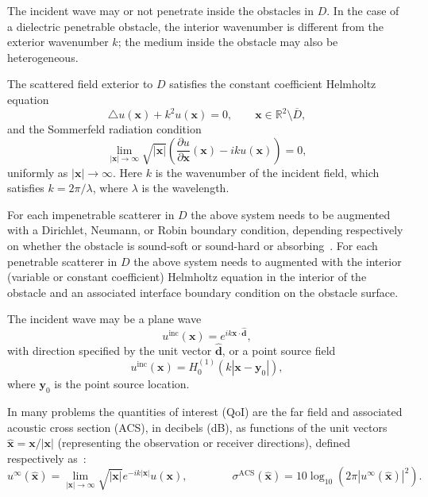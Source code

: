 \documentclass[12pt,letterpaper,final]{article}
\newcommand{\x}{\boldsymbol{x}}
\newcommand{\xh}{\widehat{\boldsymbol{x}}}
\newcommand{\y}{\boldsymbol{y}}
\newcommand{\dd}{\boldsymbol{d}}
\newcommand{\hdd}{\widehat{\dd}}
\newcommand{\bbR}{\mathbb{R}}
\newcommand{\inc}{\mathrm{inc}}
\begin{document}
The incident wave may or not penetrate inside the obstacles in $D$.
In the case of a dielectric penetrable obstacle, the interior wavenumber
is different from the exterior wavenumber $k$; the 
medium inside the obstacle
may also be heterogeneous. 

The scattered field exterior to $D$  satisfies the constant coefficient 
Helmholtz equation~\cite{colton:inverse}
\begin{equation}
\label{eq:helmholtz}
\triangle u(\x) + k^2 u(\x) = 0, \qquad \x \in \bbR^2 \setminus \overline{D},
\end{equation}
and  the
Sommerfeld radiation condition~\cite[Equation~(3.85)]{colton:inverse}
\begin{equation}
\label{eq:radiation-condition}
\lim_{|\x| \to \infty} \sqrt{|\x|} \left(\frac{\partial u}{\partial \x}(\x) - ik u(\x) \right) = 0,
\end{equation}
uniformly as $|\x| \to \infty$. 
Here $k$ is the wavenumber of the incident field, which satisfies
$k = 2 \pi / \lambda$, 
where $\lambda$ is the wavelength. 

For each impenetrable scatterer in $D$ the above system
needs to be augmented with a Dirichlet, Neumann, or Robin boundary condition, depending 
respectively on whether the obstacle is sound-soft or sound-hard or absorbing~\cite{colton:inverse, ghh:tmatrix}. 
For each penetrable scatterer in $D$ the above system 
needs to augmented with the interior 
(variable or constant coefficient) Helmholtz equation in the interior of the
obstacle
and an associated interface boundary condition on the obstacle surface.


The incident wave may be a plane wave
\begin{equation}
\label{eq:plane-wave}
u^\inc(\x) = e^{i k \x \cdot \hdd},
\end{equation}
with direction specified by the unit vector $\hdd$, or
a point source field
\begin{equation}
\label{eq:point-source}
u^\inc(\x) = H_0^{(1)} (k |\x - \y_0|),
\end{equation}
where $\y_0$ is the point source location.

In many problems
the quantities of interest (QoI) are  the  far field and associated
acoustic
cross section (ACS), in decibels (dB), 
as functions of the unit vectors $\xh = \x / |\x|$ 
(representing the observation or receiver directions), 
defined respectively as~\cite{colton:inverse, ghh:tmatrix}:
\begin{equation}
\label{eq:far-field}
u^\infty(\xh) = \lim_{|\x| \to \infty} \sqrt{|\x|} e^{-i k |\x|} u(\x), \qquad \qquad  
\sigma^{\mathrm{ACS}} (\xh) = 10\log_{10} (2\pi\left|u^\infty(\xh)\right|^2).
\end{equation}
\end{document}
